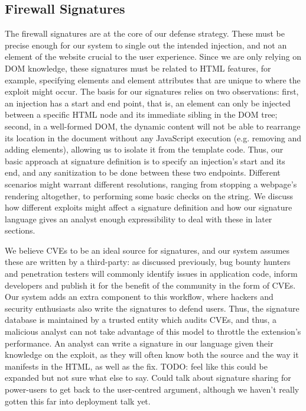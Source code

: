  \subsection{Firewall Signatures}
	 The firewall signatures are at the core of our defense strategy. These must be precise enough for our system to single out the intended injection, and not an element of the website crucial to the user experience. Since we are only relying on DOM knowledge, these signatures must be related to HTML features, for example, specifying elements and element attributes that are unique to where the exploit might occur. The basis for our signatures relies on two observations: first, an injection has a start and end point, that is, an element can only be injected between a specific HTML node and its immediate sibling in the DOM tree; second, in a well-formed DOM, the dynamic content will not be able to rearrange its location in the document without any JavaScript execution (e.g. removing and adding elements), allowing us to isolate it from the template code. Thus, our basic approach at signature definition is to specify an injection's start and its end, and any sanitization to be done between these two endpoints. Different scenarios might warrant different resolutions, ranging from stopping a webpage's rendering altogether, to performing some basic checks on the string. We discuss how different exploits might affect a signature definition and how our signature language gives an analyst enough expressibility to deal with these in later sections.
	 
	 We believe CVEs to be an ideal source for signatures, and our system assumes these are written by a third-party: as discussed previously, bug bounty hunters and penetration testers will commonly identify issues in application code, inform developers and publish it for the benefit of the community in the form of CVEs. Our system adds an extra component to this workflow, where hackers and security enthusiasts also write the signatures to defend users. Thus, the signature database is maintained by a trusted entity which audits CVEs, and thus, a malicious analyst can not take advantage of this model to throttle the extension's performance. An analyst can write a signature in our language given their knowledge on the exploit, as they will often know both the source and the way it manifests in the HTML, as well as the fix. TODO: feel like this could be expanded but not sure what else to say. Could talk about signature sharing for power-users to get back to the user-centred argument, although we haven't really gotten this far into deployment talk yet.
 
